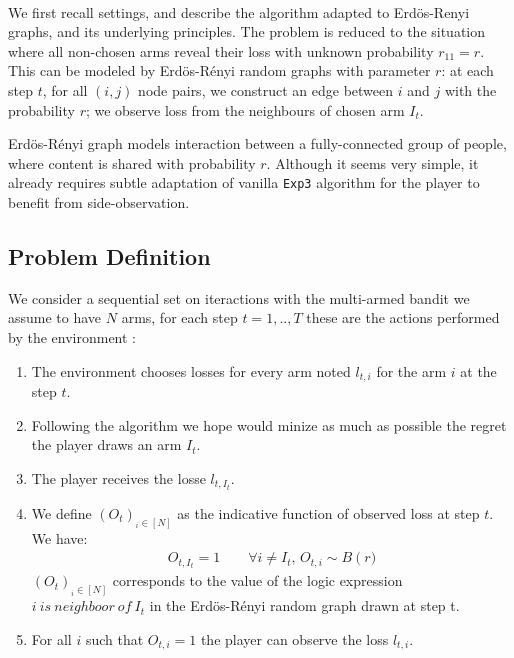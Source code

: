 \documentclass[11pt,a4paper]{article}
\begin{document}
\paragraph{}We first recall \cite{valko} settings, and describe the algorithm adapted to Erdös-Renyi graphs, and its underlying principles. The problem is reduced to the situation where all non-chosen arms reveal their loss with unknown probability $r_{11}=r$. This can be modeled by Erdös-Rényi random graphs with parameter $r$: at each step $t$, for all $(i,j)$ node pairs, we construct an edge between $i$ and $j$ with the probability $r$; we observe loss from the neighbours of chosen arm $I_t$.

Erdös-Rényi graph models interaction between a fully-connected group of people, where content is shared with probability $r$. Although it seems very simple, it already requires subtle adaptation of vanilla \verb|Exp3| algorithm for the player to benefit from side-observation.

\subsection{Problem Definition}
We consider a sequential set on iteractions with the multi-armed bandit we assume to have $N$ arms, for each step $t=1,..,T$ these are the actions performed by the environment : 
\begin{enumerate}
\item The environment chooses losses for every arm noted $l_{t,i}$ for the arm $i$ at the step $t$.
\item Following the algorithm we hope would minize as much as possible the regret the player draws an arm $I_t$.
\item The player receives the losse $l_{t,I_t}$.
\item We define $\left(O_t\right)_{_i\in\left[N\right]}$ as the indicative function of observed loss at step $t$. We have:
\begin{align*}
O_{t,I_t}=1 \qquad \forall i \neq I_t,\, O_{t,i} \sim B\left(r\right.)
\end{align*}
$\left(O_t\right)_{_i\in\left[N\right]}$ corresponds to the value of the logic expression $ i \ is\ neighboor\ of\ I_t$ in the Erdös-Rényi random graph drawn at step t.
\item For all $i$ such that $O_{t,i}=1$ the player can observe the loss $l_{t,i}$.
\end{enumerate}
 
\end{document}
